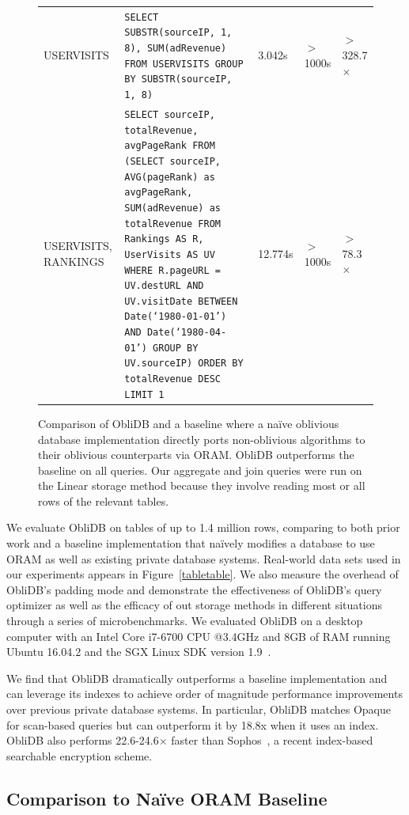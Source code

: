 \documentclass[letterpaper,twocolumn,10pt]{article}
\def\name/{ObliDB}
\begin{document}
\begin{figure}
\begin{tabularx}{\textwidth}{p{1.9cm} X l l l}
USERVISITS & \footnotesize\texttt{SELECT SUBSTR(sourceIP, 1, 8), SUM(adRevenue) FROM USERVISITS GROUP BY SUBSTR(sourceIP, 1, 8)}& 3.042s &$>$1000s & $>$328.7$\times$\\\rule{0pt}{2ex}
USERVISITS, RANKINGS & \footnotesize\texttt{SELECT sourceIP, totalRevenue, avgPageRank
FROM
  (SELECT sourceIP,
          AVG(pageRank) as avgPageRank,
          SUM(adRevenue) as totalRevenue
    FROM Rankings AS R, UserVisits AS UV
    WHERE R.pageURL = UV.destURL
       AND UV.visitDate BETWEEN Date(`1980-01-01') AND Date(`1980-04-01')
    GROUP BY UV.sourceIP)
  ORDER BY totalRevenue DESC LIMIT 1} & 12.774s & $>$1000s& $>$78.3$\times$\\
\end{tabularx}
\caption{\small Comparison of \name/ and a baseline where a na\"ive oblivious database implementation directly ports non-oblivious algorithms to their oblivious counterparts via ORAM. \name/ outperforms the baseline on all queries. Our aggregate and join queries were run on the Linear storage method because they involve reading most or all rows of the relevant tables.}
\label{figQueries}
\end{figure}
We evaluate \name/ on tables of up to 1.4 million rows, comparing to both prior work and a baseline implementation that na\"ively modifies a database to use ORAM as well as existing private database systems. Real-world data sets used in our experiments appears in Figure~\ref{tabletable}. We also measure the overhead of \name/'s padding mode and  demonstrate the effectiveness of \name/'s query optimizer as well as the efficacy of out storage methods in different situations through a series of microbenchmarks. We evaluated \name/ on a desktop computer with an Intel Core i7-6700 CPU @3.4GHz and 8GB of RAM running Ubuntu 16.04.2 and the SGX Linux SDK version 1.9~\cite{SGXRef}.

We find that \name/ dramatically outperforms a baseline implementation and can leverage its indexes to achieve order of magnitude performance improvements over previous private database systems. In particular, \name/ matches Opaque~\cite{ZDB+17} for scan-based queries but can outperform it by 18.8x when it uses an index. \name/ also performs 22.6-24.6$\times$ faster than Sophos~\cite{Bost16}, a recent index-based searchable encryption scheme.

\subsection{Comparison to Na\"ive ORAM Baseline}
\end{document}
